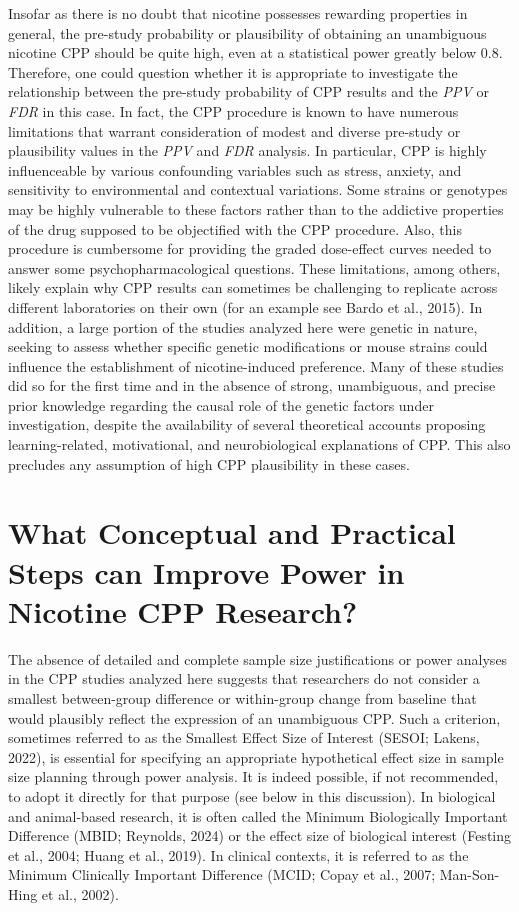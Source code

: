 \documentclass[authordate, meta, issue]{jote-new-article}
\begin{document}
	Insofar as there is no doubt that nicotine possesses rewarding properties in general, the pre-study probability or plausibility of obtaining an unambiguous nicotine CPP should be quite high, even at a statistical power greatly below 0.8. Therefore, one could question whether it is appropriate to investigate the relationship between the pre-study probability of CPP results and the \emph{PPV} or \emph{FDR} in this case. In fact, the CPP procedure is known to have numerous limitations that warrant consideration of modest and diverse pre-study or plausibility values in the \emph{PPV} and \emph{FDR} analysis. In particular, CPP is highly influenceable by various confounding variables such as stress, anxiety, and sensitivity to environmental and contextual variations. Some strains or genotypes may be highly vulnerable to these factors rather than to the addictive properties of the drug supposed to be objectified with the CPP procedure. Also, this procedure is cumbersome for providing the graded dose-effect curves needed to answer some psychopharmacological questions. These limitations, among others, likely explain why CPP results can sometimes be challenging to replicate across different laboratories on their own (for an example see Bardo et al., 2015). In addition, a large portion of the studies analyzed here were genetic in nature, seeking to assess whether specific genetic modifications or mouse strains could influence the establishment of nicotine-induced preference. Many of these studies did so for the first time and in the absence of strong, unambiguous, and precise prior knowledge regarding the causal role of the genetic factors under investigation, despite the availability of several theoretical accounts proposing learning-related, motivational, and neurobiological explanations of CPP. This also precludes any assumption of high CPP plausibility in these cases.



	\section{What Conceptual and Practical Steps can Improve Power in Nicotine CPP Research?}



	The absence of detailed and complete sample size justifications or power analyses in the CPP studies analyzed here suggests that researchers do not consider a smallest between-group difference or within-group change from baseline that would plausibly reflect the expression of an unambiguous CPP. Such a criterion, sometimes referred to as the Smallest Effect Size of Interest (SESOI; Lakens, 2022), is essential for specifying an appropriate hypothetical effect size in sample size planning through power analysis. It is indeed possible, if not recommended, to adopt it directly for that purpose (see below in this discussion). In biological and animal-based research, it is often called the Minimum Biologically Important Difference (MBID; Reynolds, 2024) or the effect size of biological interest (Festing et al., 2004; Huang et al., 2019). In clinical contexts, it is referred to as the Minimum Clinically Important Difference (MCID; Copay et al., 2007; Man-Son-Hing et al., 2002).
\end{document}
